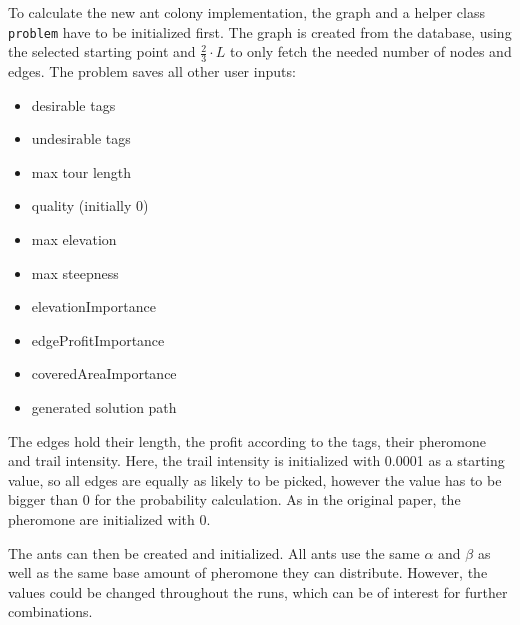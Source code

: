 To calculate the new ant colony implementation, the graph and a helper class \texttt{problem} have to be initialized first. 
The graph is created from the database, using the selected starting point and $\frac{2}{3} \cdot L$ to only fetch the needed number of nodes and edges.
The problem saves all other user inputs:


\begin{minipage}[t][2cm][b]{0.3\textwidth}
	\begin{itemize}
		\item desirable tags
		\item undesirable tags
		\item max tour length
	
	\end{itemize}
\end{minipage}
\begin{minipage}[t][2cm][b]{0.3\textwidth}
	\begin{itemize}
		\item quality (initially 0)
		\item max elevation
		\item max steepness
	\end{itemize}	
\end{minipage}
\begin{minipage}[t][2.9cm][b]{0.33\textwidth}
	\begin{itemize}
		\item elevationImportance
		\item edgeProfitImportance
		\item coveredAreaImportance
		\item generated solution path
	\end{itemize}	
\end{minipage}

\vspace{1cm}
The edges hold their length, the profit according to the tags, their pheromone and trail intensity. 
Here, the trail intensity is initialized with 0.0001 as a starting value, so all edges are equally as likely to be picked, however the value has to be bigger than 0 for the probability calculation.
As in the original paper, the pheromone are initialized with 0.

The ants can then be created and initialized. 
All ants use the same $\alpha$ and $\beta$ as well as the same base amount of pheromone they can distribute.
However, the values could be changed throughout the runs, which can be of interest for further combinations.

